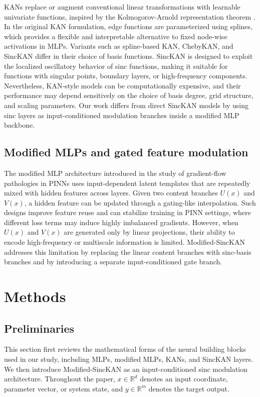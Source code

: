 \documentclass[preprint,12pt]{elsarticle}
\begin{document}
KANs replace or augment conventional linear transformations with learnable univariate functions, inspired by the Kolmogorov-Arnold representation theorem \cite{liu2024kan}. In the original KAN formulation, edge functions are parameterized using splines, which provides a flexible and interpretable alternative to fixed node-wise activations in MLPs. Variants such as spline-based KAN, ChebyKAN, and SincKAN differ in their choice of basis functions. SincKAN \cite{yu2026sinckan} is designed to exploit the localized oscillatory behavior of sinc functions, making it suitable for functions with singular points, boundary layers, or high-frequency components. Nevertheless, KAN-style models can be computationally expensive, and their performance may depend sensitively on the choice of basis degree, grid structure, and scaling parameters. Our work differs from direct SincKAN models by using sinc layers as input-conditioned modulation branches inside a modified MLP backbone.

\subsection{Modified MLPs and gated feature modulation}

The modified MLP architecture introduced in the study of gradient-flow pathologies in PINNs \cite{wang2021gradientpathologies} uses input-dependent latent templates that are repeatedly mixed with hidden features across layers. Given two content branches \(U(x)\) and \(V(x)\), a hidden feature can be updated through a gating-like interpolation. Such designs improve feature reuse and can stabilize training in PINN settings, where different loss terms may induce highly imbalanced gradients. However, when \(U(x)\) and \(V(x)\) are generated only by linear projections, their ability to encode high-frequency or multiscale information is limited. Modified-SincKAN addresses this limitation by replacing the linear content branches with sinc-basis branches and by introducing a separate input-conditioned gate branch.

\section{Methods}

\subsection{Preliminaries}

This section first reviews the mathematical forms of the neural building blocks used in our study, including MLPs, modified MLPs, KANs, and SincKAN layers. We then introduce Modified-SincKAN as an input-conditioned sinc modulation architecture. Throughout the paper, \(x\in\mathbb{R}^{d}\) denotes an input coordinate, parameter vector, or system state, and \(y\in\mathbb{R}^{m}\) denotes the target output.
\end{document}
